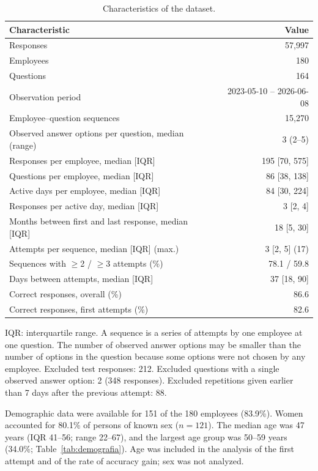 \documentclass[11pt]{article}
\providecommand{\uwagatabeli}[1]{\par\vspace{2pt}\parbox{\linewidth}{\footnotesize #1}}
\newcommand{\NExcluded}{212}
\newcommand{\NExcludedItems}{2}
\newcommand{\NExcludedItemResp}{348}
\newcommand{\NExcludedShortRep}{88}
\newcommand{\MinGapDays}{7}
\newcommand{\DemoN}{180}
\newcommand{\DemoMatched}{151}
\newcommand{\DemoMatchedPct}{83.9}
\newcommand{\DemoWomen}{121}
\newcommand{\DemoWomenPct}{80.1}
\newcommand{\AgeMedian}{47}
\newcommand{\AgeQOne}{41}
\newcommand{\AgeQThree}{56}
\newcommand{\AgeMin}{22}
\newcommand{\AgeMax}{67}
\newcommand{\AgeModalGroup}{50--59}
\newcommand{\AgeModalGroupPct}{34.0}
\begin{document}
\begin{table}[H]
\centering
\caption{Characteristics of the dataset.}
\label{tab:zbior_danych}
\small
\begin{tabular}{lr}
\toprule
Characteristic & Value \\
\midrule
Responses & 57{,}997 \\
Employees & 180 \\
Questions & 164 \\
Observation period & 2023-05-10 -- 2026-06-08 \\
Employee--question sequences & 15{,}270 \\
Observed answer options per question, median (range) & 3 (2--5) \\
\midrule
Responses per employee, median [IQR] & 195 [70, 575] \\
Questions per employee, median [IQR] & 86 [38, 138] \\
Active days per employee, median [IQR] & 84 [30, 224] \\
Responses per active day, median [IQR] & 3 [2, 4] \\
Months between first and last response, median [IQR] & 18 [5, 30] \\
\midrule
Attempts per sequence, median [IQR] (max.) & 3 [2, 5] (17) \\
Sequences with $\geq$2 / $\geq$3 attempts (\%) & 78.1 / 59.8 \\
Days between attempts, median [IQR] & 37 [18, 90] \\
\midrule
Correct responses, overall (\%) & 86.6 \\
Correct responses, first attempts (\%) & 82.6 \\
\bottomrule
\end{tabular}
\uwagatabeli{IQR: interquartile range. A sequence is a series of attempts by one employee at one
question. The number of observed answer options may be smaller than the number of options in the
question because some options were not chosen by any employee. Excluded test responses: \NExcluded.
Excluded questions with a single observed answer option: \NExcludedItems{} (\NExcludedItemResp{}
responses). Excluded repetitions given earlier than \MinGapDays{} days after the previous attempt:
\NExcludedShortRep.}
\end{table}

Demographic data were available for \DemoMatched{} of the \DemoN{} employees (\DemoMatchedPct\%).
Women accounted for \DemoWomenPct\% of persons of known sex ($n = \DemoWomen$). The median age was
\AgeMedian{} years (IQR \AgeQOne--\AgeQThree; range \AgeMin--\AgeMax), and the largest age group was
\AgeModalGroup{} years (\AgeModalGroupPct\%; Table~\ref{tab:demografia}). Age was included in the
analysis of the first attempt and of the rate of accuracy gain; sex was not analyzed.
\end{document}
